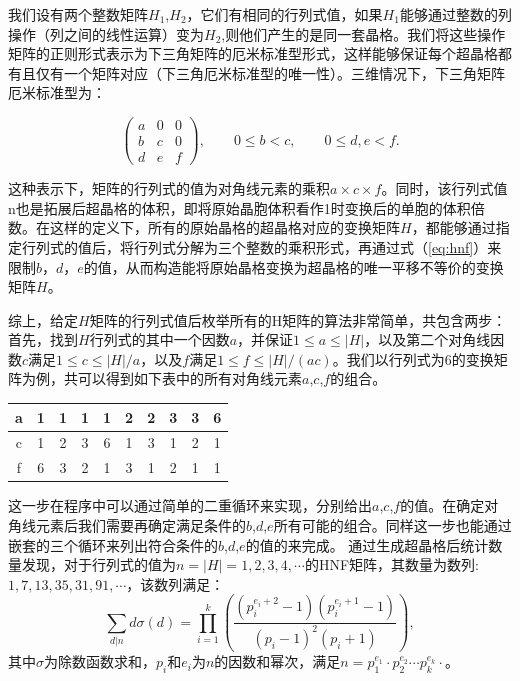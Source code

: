 我们设有两个整数矩阵$H_1$,$H_2$，它们有相同的行列式值，如果$H_1$能够通过整数的列操作（列之间的线性运算）变为$H_2$,则他们产生的是同一套晶格。我们将这些操作矩阵的正则形式表示为下三角矩阵的厄米标准型形式，这样能够保证每个超晶格都有且仅有一个矩阵对应（下三角厄米标准型的唯一性\cite{santoro1973coincidence}）。三维情况下，下三角矩阵厄米标准型为：

\begin{equation}\label{eq:hnf}
  \begin{pmatrix}
    a & 0 & 0 \\
    b & c & 0 \\
    d & e & f
  \end{pmatrix}, \qquad
  0\leq b < c, \qquad
  0\leq d, e< f.
\end{equation}

这种表示下，矩阵的行列式的值为对角线元素的乘积$a\times c \times f$。同时，该行列式值n也是拓展后超晶格的体积，即将原始晶胞体积看作1时变换后的单胞的体积倍数。在这样的定义下，所有的原始晶格的超晶格对应的变换矩阵$H$，都能够通过指定行列式的值后，将行列式分解为三个整数的乘积形式，再通过式（\ref{eq:hnf}）来限制$b$，$d$，$e$的值，从而构造能将原始晶格变换为超晶格的唯一平移不等价的变换矩阵$H$。

综上，给定$H$矩阵的行列式值后枚举所有的H矩阵的算法非常简单，共包含两步：首先，找到$H$行列式的其中一个因数$a$，并保证$1\leq a \leq |H|$，以及第二个对角线因数$c$满足$1\leq c\leq |H|/a$，以及$f$满足$1\leq f\leq |H|/(ac)$。我们以行列式为\num{6}的变换矩阵为例，共可以得到如下表中的所有对角线元素$a$,$c$,$f$的组合。

\begin{table}
  \centering
  \begin{tabular}{c|ccccccccc}
    a & 1 & 1 & 1 & 1 & 2 & 2 & 3 & 3 & 6 \\
    \hline
    c & 1 & 2 & 3 & 6 & 1 & 3 & 1 & 2 & 1 \\
    \hline
    f & 6 & 3 & 2 & 1 & 3 & 1 & 2 & 1 & 1 \\
  \end{tabular}
\end{table}

这一步在程序中可以通过简单的二重循环来实现，分别给出$a$,$c$,$f$的值。在确定对角线元素后我们需要再确定满足条件的$b$,$d$,$e$所有可能的组合。同样这一步也能通过嵌套的三个循环来列出符合条件的$b$,$d$,$e$的值的来完成。
通过生成超晶格后统计数量发现，对于行列式的值为$n=|H|=1,2,3,4,\cdots$的HNF矩阵，其数量为数列:$1,7,13,35,31,91,\cdots$，该数列满足：
\begin{equation}
  \sum_{d|n} d\sigma(d) = \prod^k_{i=1}\left( {\frac{(p_i^{e_i + 2}-1)(p_i^{e_i + 1}-1)}{(p_i-1)^2(p_i+1)}} \right),
\end{equation}
其中$\sigma$为除数函数求和\cite{erdiis1952distribution}，$p_i$和$e_i$为$n$的因数和幂次，满足$n=p_1^{e_1}\cdot p_2^{e_2}\cdots p_k^{e_k}\cdot$。

